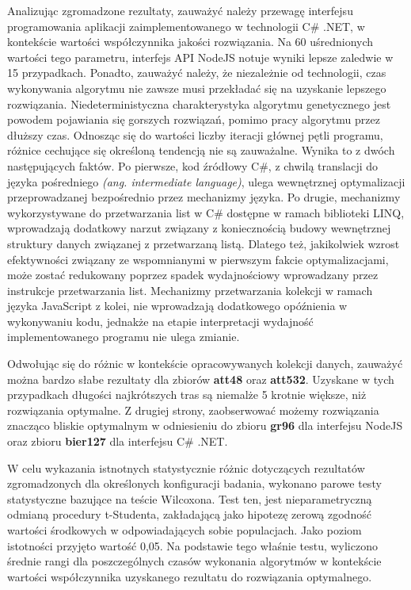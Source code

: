 Analizując zgromadzone rezultaty, zauważyć należy przewagę interfejsu programowania aplikacji zaimplementowanego w technologii C\# .NET, w kontekście wartości współczynnika jakości rozwiązania. Na 60 uśrednionych wartości tego parametru, interfejs API NodeJS notuje wyniki lepsze zaledwie w 15 przypadkach. Ponadto, zauważyć należy, że niezależnie od technologii, czas wykonywania algorytmu nie zawsze musi przekładać się na uzyskanie lepszego rozwiązania. Niedeterministyczna charakterystyka algorytmu genetycznego jest powodem pojawiania się gorszych rozwiązań, pomimo pracy algorytmu przez dłuższy czas. Odnosząc się do wartości liczby iteracji głównej pętli programu, różnice cechujące się określoną tendencją nie są zauważalne. Wynika to z dwóch następujących faktów. Po pierwsze, kod źródłowy C\#, z chwilą translacji do języka pośredniego \textit{(ang. intermediate language)}, ulega wewnętrznej optymalizacji przeprowadzanej bezpośrednio przez mechanizmy języka. Po drugie, mechanizmy wykorzystywane do przetwarzania list w C\# dostępne w ramach biblioteki LINQ, wprowadzają dodatkowy narzut związany z koniecznością budowy wewnętrznej struktury danych związanej z przetwarzaną listą. Dlatego też, jakikolwiek wzrost efektywności związany ze wspomnianymi w pierwszym fakcie optymalizacjami, może zostać redukowany poprzez spadek wydajnościowy wprowadzany przez instrukcje przetwarzania list. Mechanizmy przetwarzania kolekcji w ramach języka JavaScript z kolei, nie wprowadzają dodatkowego opóźnienia w wykonywaniu kodu, jednakże na etapie interpretacji wydajność implementowanego programu nie ulega zmianie.

Odwołując się do różnic w kontekście opracowywanych kolekcji danych, zauważyć można bardzo słabe rezultaty dla zbiorów \textbf{att48} oraz \textbf{att532}. Uzyskane w tych przypadkach długości najkrótszych tras są niemalże 5 krotnie większe, niż rozwiązania optymalne. Z drugiej strony, zaobserwować możemy rozwiązania znacząco bliskie optymalnym w odniesieniu do zbioru \textbf{gr96} dla interfejsu NodeJS oraz zbioru \textbf{bier127} dla interfejsu C\# .NET.

W celu wykazania istnotnych statystycznie różnic dotyczących rezultatów zgromadzonych dla określonych konfiguracji badania, wykonano parowe testy statystyczne bazujące na teście Wilcoxona. Test ten, jest nieparametryczną odmianą procedury t-Studenta, zakładającą jako hipotezę zerową zgodność wartości środkowych w odpowiadających sobie populacjach. Jako poziom istotności przyjęto wartość 0,05. Na podstawie tego właśnie testu, wyliczono średnie rangi dla poszczególnych czasów wykonania algorytmów w kontekście wartości współczynnika uzyskanego rezultatu do rozwiązania optymalnego.

